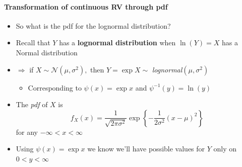 \documentclass[notes=show,smaller,handout]{beamer}\usepackage[]{graphicx}\usepackage[]{color}
\newcommand{\N}{\mathcal{N}}
\newenvironment{stepitemize}{\begin{itemize}[<+->]}{\end{itemize} }
\begin{document}
\begin{frame}{\secname}
  \framesubtitle{Transformation of continuous RV through pdf }

  \begin{example}
  \begin{stepitemize}
  \item So what is the pdf for the lognormal distribution?

  \item Recall that $Y$ has a \textbf{lognormal distribution} when $\ln \left(
  Y\right) =X$ has a Normal distribution

  \item $\Rightarrow $ if $X\sim \N\left( \mu ,\sigma ^{2}\right) ,$ then $%
  Y=\exp X \sim $ \emph{lognormal}$\left( \mu ,\sigma ^{2}\right) $

  \begin{stepitemize}
  \item Corresponding to $\psi \left( x\right) =\exp x$ and $\psi
  ^{-1}\left( y\right) =\ln (y)$
  \end{stepitemize}

  \item The \emph{pdf} of $X$ is
  \begin{equation*}
  f_{X}\left( x\right) =\frac{1}{\sqrt{2\pi \sigma ^{2}}}\exp{ \left\{ -\frac{1%
  }{2\sigma ^{2}}\left( x-\mu \right) ^{2}\right\}}
  \end{equation*}%
  for any $-\infty <x<\infty $

  \item Using $\psi \left( x\right) =\exp x$ we know we'll have possible
  values for $Y$ only on $0<y<\infty $
  \end{stepitemize}
  \end{example}
\end{frame}
\end{document}
